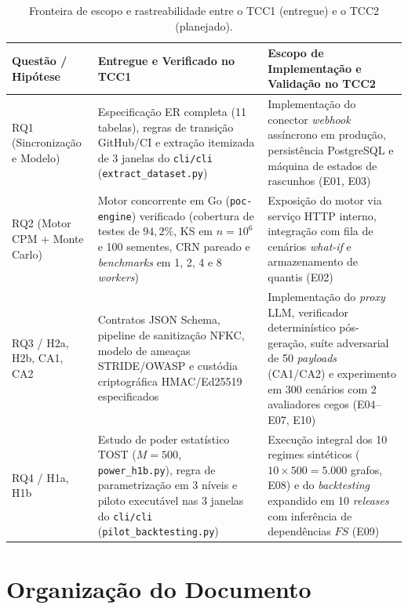\documentclass[12pt,openany,oneside,a4paper,english,brazilian,sumario=tradicional]{abntex2}
\newcommand{\fonteautores}{\par\vspace{1mm}{\small Fonte: Elaborado pelos autores (2026).}}
\begin{document}
\begin{table}[htbp]
\caption{Fronteira de escopo e rastreabilidade entre o TCC1 (entregue) e o TCC2 (planejado).}\label{tab:fronteira_tcc1_tcc2}
\footnotesize
\begin{tabularx}{\textwidth}{L{2.5cm} Y Y}
\toprule
\textbf{Questão / Hipótese} & \textbf{Entregue e Verificado no TCC1} & \textbf{Escopo de Implementação e Validação no TCC2}\\
\midrule
RQ1 (Sincronização e Modelo) & Especificação ER completa (11 tabelas), regras de transição GitHub/CI e extração itemizada de 3 janelas do \texttt{cli/cli} (\texttt{extract\_dataset.py}) & Implementação do conector \textit{webhook} assíncrono em produção, persistência PostgreSQL e máquina de estados de rascunhos (E01, E03)\\
RQ2 (Motor CPM + Monte Carlo) & Motor concorrente em Go (\texttt{poc-engine}) verificado (cobertura de testes de $94{,}2\%$, KS em $n=10^6$ e 100 sementes, CRN pareado e \textit{benchmarks} em 1, 2, 4 e 8 \textit{workers}) & Exposição do motor via serviço HTTP interno, integração com fila de cenários \textit{what-if} e armazenamento de quantis (E02)\\
RQ3 / H2a, H2b, CA1, CA2 & Contratos JSON Schema, pipeline de sanitização NFKC, modelo de ameaças STRIDE/OWASP e custódia criptográfica HMAC/Ed25519 especificados & Implementação do \textit{proxy} LLM, verificador determinístico pós-geração, suíte adversarial de 50 \textit{payloads} (CA1/CA2) e experimento em 300 cenários com 2 avaliadores cegos (E04--E07, E10)\\
RQ4 / H1a, H1b & Estudo de poder estatístico TOST ($M=500$, \texttt{power\_h1b.py}), regra de parametrização em 3 níveis e piloto executável nas 3 janelas do \texttt{cli/cli} (\texttt{pilot\_backtesting.py}) & Execução integral dos 10 regimes sintéticos ($10 \times 500 = 5.000$ grafos, E08) e do \textit{backtesting} expandido em 10 \textit{releases} com inferência de dependências $FS$ (E09)\\
\bottomrule
\end{tabularx}
\fonteautores
\end{table}

\section{Organização do Documento}
\end{document}

